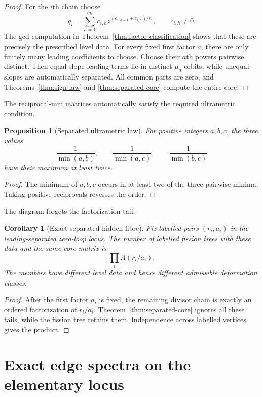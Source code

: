 \documentclass[11pt,a4paper]{amsart}
\theoremstyle{plain}
\newtheorem{proposition}[theorem]{Proposition}
\newtheorem{corollary}[theorem]{Corollary}
\theoremstyle{definition}
\begin{document}
\begin{proof}
For the $i$th chain choose
\[
 q_i=\sum_{h=1}^{m_i}c_{i,h}
 z^{(e_{i,h-1}+e_{i,h})/r_i},\qquad c_{i,h}\ne0.
\]
The gcd computation in Theorem~\ref{thm:factor-classification} shows that these are precisely the
prescribed level data.  For every fixed first factor $a$, there are only finitely many leading
coefficients to choose.  Choose their $a$th powers pairwise distinct.  Then equal-slope leading
terms lie in distinct $\mu_a$-orbits, while unequal slopes are automatically separated.  All
common parts are zero, and Theorems~\ref{thm:sign-law} and \ref{thm:separated-core} compute the
entire core.
\end{proof}

The reciprocal-min matrices automatically satisfy the required ultrametric condition.

\begin{proposition}[Separated ultrametric law]\label{prop:separated-ultra}
For positive integers $a,b,c$, the three values
\[
 \frac1{\min(a,b)},\qquad \frac1{\min(a,c)},\qquad \frac1{\min(b,c)}
\]
have their maximum at least twice.
\end{proposition}

\begin{proof}
The minimum of $a,b,c$ occurs in at least two of the three pairwise minima.  Taking positive
reciprocals reverses the order.
\end{proof}

The diagram forgets the factorization tail.

\begin{corollary}[Exact separated hidden fibre]\label{cor:hidden-fibre}
Fix labelled pairs $(r_i,a_i)$ in the leading-separated zero-loop locus.  The number of labelled
fission trees with these data and the same core matrix is
\[
 \prod_i A(r_i/a_i).
\]
The members have different level data and hence different admissible deformation classes.
\end{corollary}

\begin{proof}
After the first factor $a_i$ is fixed, the remaining divisor chain is exactly an ordered
factorization of $r_i/a_i$.  Theorem~\ref{thm:separated-core} ignores all these tails, while the
fission tree retains them.  Independence across labelled vertices gives the product.
\end{proof}

\section{Exact edge spectra on the elementary locus}\label{sec:spectrum}
\end{document}

